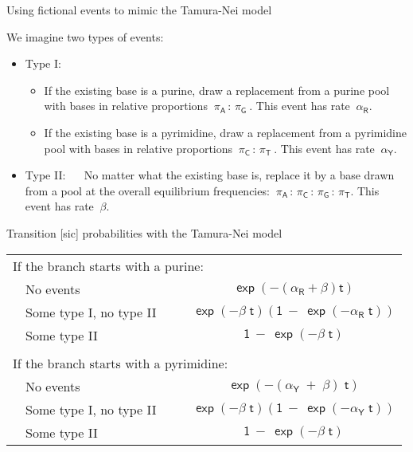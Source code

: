 \documentclass[bluish,slideColor,colorBG,pdf]{prosper}
\begin{document}
\begin{slide}[Replace]{Using fictional events to mimic the Tamura-Nei model}

We imagine two types of events:
\begin{itemize}
\item Type I:
\begin{itemize}
\item If the existing base is a purine, draw a replacement from
a purine pool with bases in relative proportions $~\mathsf{\pi_A\,:\,\pi_G}~$.
This event has rate $~\mathsf{\alpha_R}$.
\item If the existing base is a pyrimidine, draw a replacement from
a pyrimidine pool with bases in relative proportions $~\mathsf{\pi_C\,:\,\pi_T}~$.
This event has rate $~\mathsf{\alpha_Y}$.
\end{itemize}
\medskip

\item Type II: ~~ No matter what the existing base is, replace it by a base
drawn from a pool at the overall equilibrium frequencies:
$~\mathsf{\pi_A\,:\,\pi_C\,:\,\pi_G\,:\,\pi_T}$.  This event has rate
$~\mathsf{\beta}$.
\end{itemize}

\end{slide}

\begin{slide}[Replace]{Transition [sic] probabilities with the Tamura-Nei model}

\begin{center}
\renewcommand{\arraystretch}{1.5}
\begin{tabular}{l l c}
\multicolumn{3}{l}{If the branch starts with a purine:}\\
&No events ~~~ &  $\mathsf{\exp(-(\alpha_R+\beta)t)}$\\
&Some type I, no type II ~~~ &  $\mathsf{\exp(-\beta\;t)\left(1\ -\ \exp(-\alpha_R\;t)\right)}$\\
&Some type II & $\mathsf{1\ -\ \exp(-\beta\;t)}$ \\
& & \\
\multicolumn{3}{l}{If the branch starts with a pyrimidine:}\\
&No events &  $\mathsf{\exp(-(\alpha_Y\;+\;\beta)\;t)}$\\
&Some type I, no type II ~~~ &  $\mathsf{\exp(-\beta\;t)\left(1\ -\ \exp(-\alpha_Y\;t)\right)}$\\
&Some type II & $\mathsf{1\ -\ \exp(-\beta\;t)}$ \\
\end{tabular}
\end{center}

\end{slide}
\end{document}
